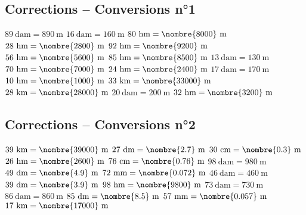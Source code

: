\documentclass[a4paper,11pt,fleqn]{article}
\begin{document}
\subsection*{Corrections -- Conversions n°1}

\begin{multicols}{4}

$89~\text{dam}=890~\text{m}$
$16~\text{dam}=160~\text{m}$
$80~\text{hm}=\nombre{8000}~\text{m}$
$28~\text{hm}=\nombre{2800}~\text{m}$
$92~\text{hm}=\nombre{9200}~\text{m}$
$56~\text{hm}=\nombre{5600}~\text{m}$
$85~\text{hm}=\nombre{8500}~\text{m}$
$13~\text{dam}=130~\text{m}$
$70~\text{hm}=\nombre{7000}~\text{m}$
$24~\text{hm}=\nombre{2400}~\text{m}$
$17~\text{dam}=170~\text{m}$
$10~\text{hm}=\nombre{1000}~\text{m}$
$33~\text{km}=\nombre{33000}~\text{m}$
$28~\text{km}=\nombre{28000}~\text{m}$
$20~\text{dam}=200~\text{m}$
$32~\text{hm}=\nombre{3200}~\text{m}$
\end{multicols}



\subsection*{Corrections -- Conversions n°2}

\begin{multicols}{4}

$39~\text{km}=\nombre{39000}~\text{m}$
$27~\text{dm}=\nombre{2.7}~\text{m}$
$30~\text{cm}=\nombre{0.3}~\text{m}$
$26~\text{hm}=\nombre{2600}~\text{m}$
$76~\text{cm}=\nombre{0.76}~\text{m}$
$98~\text{dam}=980~\text{m}$
$49~\text{dm}=\nombre{4.9}~\text{m}$
$72~\text{mm}=\nombre{0.072}~\text{m}$
$46~\text{dam}=460~\text{m}$
$39~\text{dm}=\nombre{3.9}~\text{m}$
$98~\text{hm}=\nombre{9800}~\text{m}$
$73~\text{dam}=730~\text{m}$
$86~\text{dam}=860~\text{m}$
$85~\text{dm}=\nombre{8.5}~\text{m}$
$57~\text{mm}=\nombre{0.057}~\text{m}$
$17~\text{km}=\nombre{17000}~\text{m}$
\end{multicols}
\end{document}
